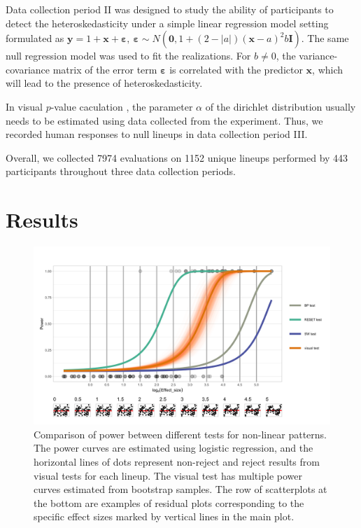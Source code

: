 \documentclass{vgtc}                          %
\begin{document}
Data collection period II was designed to study the ability of
participants to detect the heteroskedasticity under a simple linear
regression model setting formulated as 
\(\boldsymbol{y} = 1 + \boldsymbol{x} + \boldsymbol{\varepsilon}, ~ \boldsymbol{\varepsilon} \sim N(\boldsymbol{0}, 1 + (2 - |a|)(\boldsymbol{x} - a)^2b \boldsymbol{I}).\)
The same null regression model was used to fit the realizations. 
For \(b \neq 0\), the variance-covariance matrix of the error term
\(\boldsymbol{\varepsilon}\) is correlated with the predictor
\(\boldsymbol{x}\), which will lead to the presence of
heteroskedasticity.

In visual \(p\)-value caculation \cite{vanderplas2021statistical}, 
the parameter \(\alpha\) of the dirichlet distribution usually 
needs to be estimated using data collected from the experiment. 
Thus, we recorded human responses to null lineups in data collection 
period III.

Overall, we
collected 7974 evaluations on 1152 unique lineups performed by 443
participants throughout three data collection periods.

\section{Results}
\label{sec:results}

\begin{figure}[tb]
 \centering %
 \includegraphics[width=\columnwidth]{polypower-1}
 \caption{Comparison of power between different tests for non-linear patterns. The power curves are estimated using logistic regression, and the horizontal lines of dots represent non-reject and reject results from visual tests for each lineup. The visual test has multiple power curves estimated from bootstrap samples. The row of scatterplots at the bottom are examples of residual plots corresponding to the specific effect sizes marked by vertical lines in the main plot.}
 \label{fig:polypower}
\end{figure}
\end{document}
